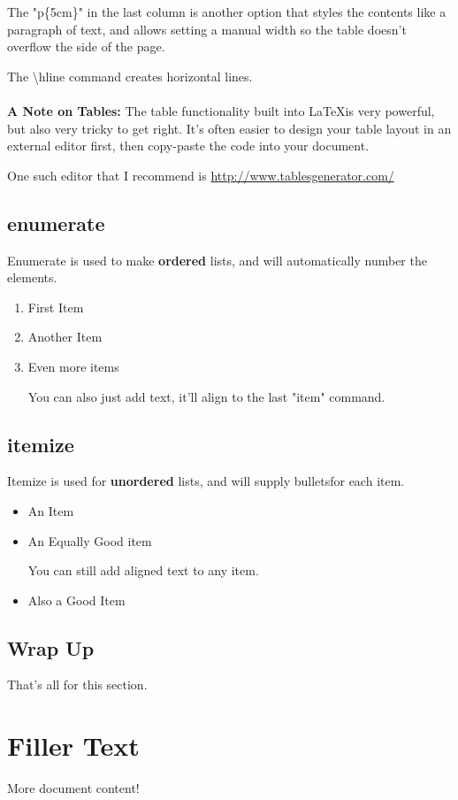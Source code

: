 \documentclass{article}
\begin{document}
        The "p\{5cm\}" in the last column is another option that styles the contents like a paragraph of text, and allows setting a manual width so the table doesn't overflow the side of the page.
        
        The \textbackslash hline command creates horizontal lines. \\\\
        
        \textbf{A Note on Tables:} The table functionality built into \LaTeX is very powerful, but also very tricky to get right. It's often easier to design your table layout in an external editor first, then copy-paste the code into your document.
        
        One such editor that I recommend is \url{http://www.tablesgenerator.com/}

    \subsection{enumerate}
        Enumerate is used to make \textbf{ordered} lists, and will automatically number the elements.
        
        \begin{enumerate}
          \item First Item
          \item Another Item
          \item Even more items
          
          You can also just add text, it'll align to the last "item" command.
        \end{enumerate}
    
    \subsection{itemize}
        Itemize is used for \textbf{unordered} lists, and will supply bulletsfor each item.
        
        \begin{itemize}
          \item An Item
          \item An Equally Good item
          
            You can still add aligned text to any item.
        
          \item Also a Good Item
          
        \end{itemize}

 \subsection{Wrap Up}
        That's all for this section.


\section{Filler Text}
More document content!
\end{document}
